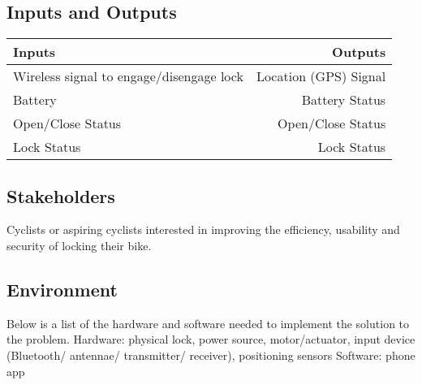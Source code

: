 \documentclass{article}
\begin{document}
\subsection{Inputs and Outputs}

\begin{table}[hp]
  \begin{center}
    \begin{tabular}{ | l|r |}
    \hline
      \textbf{Inputs} & \textbf{Outputs}\\
      \hline
      Wireless signal to engage/disengage lock  & Location (GPS) Signal\\
      Battery & Battery Status\\
      Open/Close Status & Open/Close Status\\
      Lock Status & Lock Status\\
      \hline
    \end{tabular}
  \end{center}
\end{table}

\subsection{Stakeholders}

Cyclists or aspiring cyclists interested in improving the efficiency, usability and security of locking their bike.

\subsection{Environment}

Below is a list of the hardware and software needed to implement the solution to the problem.
Hardware: physical lock, power source, motor/actuator, input device (Bluetooth/ antennae/ transmitter/ receiver), positioning sensors 
Software: phone app
\end{document}
